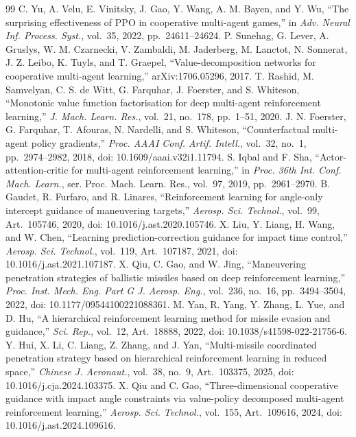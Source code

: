 \documentclass[unbranded]{cja}
\begin{document}
\begin{thebibliography}{99}
C. Yu, A. Velu, E. Vinitsky, J. Gao, Y. Wang, A. M. Bayen, and Y. Wu, ``The surprising effectiveness of PPO in cooperative multi-agent games,'' in \textit{Adv. Neural Inf. Process. Syst.}, vol.~35, 2022, pp.~24611--24624.
P. Sunehag, G. Lever, A. Gruslys, W. M. Czarnecki, V. Zambaldi, M. Jaderberg, M. Lanctot, N. Sonnerat, J. Z. Leibo, K. Tuyls, and T. Graepel, ``Value-decomposition networks for cooperative multi-agent learning,'' arXiv:1706.05296, 2017.
T. Rashid, M. Samvelyan, C. S. de Witt, G. Farquhar, J. Foerster, and S. Whiteson, ``Monotonic value function factorisation for deep multi-agent reinforcement learning,'' \textit{J. Mach. Learn. Res.}, vol.~21, no.~178, pp.~1--51, 2020.
J. N. Foerster, G. Farquhar, T. Afouras, N. Nardelli, and S. Whiteson, ``Counterfactual multi-agent policy gradients,'' \textit{Proc. AAAI Conf. Artif. Intell.}, vol.~32, no.~1, pp.~2974--2982, 2018, doi: 10.1609/aaai.v32i1.11794.
S. Iqbal and F. Sha, ``Actor-attention-critic for multi-agent reinforcement learning,'' in \textit{Proc. 36th Int. Conf. Mach. Learn.}, ser. Proc. Mach. Learn. Res., vol.~97, 2019, pp.~2961--2970.
B. Gaudet, R. Furfaro, and R. Linares, ``Reinforcement learning for angle-only intercept guidance of maneuvering targets,'' \textit{Aerosp. Sci. Technol.}, vol.~99, Art.~105746, 2020, doi: 10.1016/j.ast.2020.105746.
X. Liu, Y. Liang, H. Wang, and W. Chen, ``Learning prediction-correction guidance for impact time control,'' \textit{Aerosp. Sci. Technol.}, vol.~119, Art.~107187, 2021, doi: 10.1016/j.ast.2021.107187.
X. Qiu, C. Gao, and W. Jing, ``Maneuvering penetration strategies of ballistic missiles based on deep reinforcement learning,'' \textit{Proc. Inst. Mech. Eng. Part G J. Aerosp. Eng.}, vol.~236, no.~16, pp.~3494--3504, 2022, doi: 10.1177/09544100221088361.
M. Yan, R. Yang, Y. Zhang, L. Yue, and D. Hu, ``A hierarchical reinforcement learning method for missile evasion and guidance,'' \textit{Sci. Rep.}, vol.~12, Art.~18888, 2022, doi: 10.1038/s41598-022-21756-6.
Y. Hui, X. Li, C. Liang, Z. Zhang, and J. Yan, ``Multi-missile coordinated penetration strategy based on hierarchical reinforcement learning in reduced space,'' \textit{Chinese J. Aeronaut.}, vol.~38, no.~9, Art.~103375, 2025, doi: 10.1016/j.cja.2024.103375.
X. Qiu and C. Gao, ``Three-dimensional cooperative guidance with impact angle constraints via value-policy decomposed multi-agent reinforcement learning,'' \textit{Aerosp. Sci. Technol.}, vol.~155, Art.~109616, 2024, doi: 10.1016/j.ast.2024.109616.

\end{thebibliography}
\end{document}
